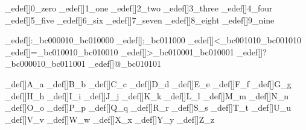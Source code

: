 \brl@char_edef[]{0}{\brl@char@alias_zero}
\brl@char_edef[]{1}{\brl@char@alias_one}
\brl@char_edef[]{2}{\brl@char@alias_two}
\brl@char_edef[]{3}{\brl@char@alias_three}
\brl@char_edef[]{4}{\brl@char@alias_four}
\brl@char_edef[]{5}{\brl@char@alias_five}
\brl@char_edef[]{6}{\brl@char@alias_six}
\brl@char_edef[]{7}{\brl@char@alias_seven}
\brl@char_edef[]{8}{\brl@char@alias_eight}
\brl@char_edef[]{9}{\brl@char@alias_nine}


\brl@char_edef[]{:}{\brl@char_bc000010\brl@char_bc010000}
\brl@char_edef[]{;}{\brl@char_bc011000}
\brl@char_edef[]{<}{\brl@char_bc001010\brl@char_bc001010}
\brl@char_edef[]{=}{\brl@char_bc010010\brl@char_bc010010}
\brl@char_edef[]{>}{\brl@char_bc010001\brl@char_bc010001}
\brl@char_edef[]{?}{\brl@char_bc000010\brl@char_bc011001}
\brl@char_edef[]{@}{\brl@char_bc010101}

\brl@char_def[]{A}{\brl@char@alias_a}
\brl@char_def[]{B}{\brl@char@alias_b}
\brl@char_def[]{C}{\brl@char@alias_c}
\brl@char_def[]{D}{\brl@char@alias_d}
\brl@char_def[]{E}{\brl@char@alias_e}
\brl@char_def[]{F}{\brl@char@alias_f}
\brl@char_def[]{G}{\brl@char@alias_g}
\brl@char_def[]{H}{\brl@char@alias_h}
\brl@char_def[]{I}{\brl@char@alias_i}
\brl@char_def[]{J}{\brl@char@alias_j}
\brl@char_def[]{K}{\brl@char@alias_k}
\brl@char_def[]{L}{\brl@char@alias_l}
\brl@char_def[]{M}{\brl@char@alias_m}
\brl@char_def[]{N}{\brl@char@alias_n}
\brl@char_def[]{O}{\brl@char@alias_o}
\brl@char_def[]{P}{\brl@char@alias_p}
\brl@char_def[]{Q}{\brl@char@alias_q}
\brl@char_def[]{R}{\brl@char@alias_r}
\brl@char_def[]{S}{\brl@char@alias_s}
\brl@char_def[]{T}{\brl@char@alias_t}
\brl@char_def[]{U}{\brl@char@alias_u}
\brl@char_def[]{V}{\brl@char@alias_v}
\brl@char_def[]{W}{\brl@char@alias_w}
\brl@char_def[]{X}{\brl@char@alias_x}
\brl@char_def[]{Y}{\brl@char@alias_y}
\brl@char_def[]{Z}{\brl@char@alias_z}


